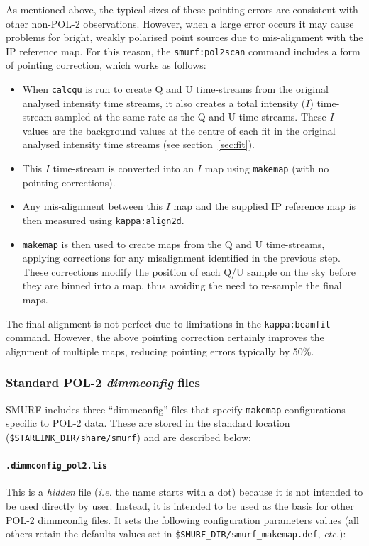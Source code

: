 \documentclass[twoside,11pt]{starlink}
\begin{document}
As mentioned above, the typical sizes of these pointing errors are
consistent with other non-POL-2 observations. However, when a large error
occurs it may cause problems for bright, weakly polarised point sources
due to mis-alignment with the IP reference map. For this reason, the
\texttt{smurf:pol2scan} command includes a form of pointing correction,
which works as follows:

\begin{itemize}
\item When \texttt{calcqu} is run to create Q and U time-streams from the
original analysed intensity time streams, it also creates a total
intensity ($I$) time-stream sampled at the same rate as the Q and U
time-streams. These $I$ values are the background values at the
centre of each fit in the original analysed intensity time streams (see
section~\ref{sec:fit}).
\item This $I$ time-stream is converted into an $I$ map using \texttt{makemap}
(with no pointing corrections).
\item Any mis-alignment between this $I$ map and the supplied IP reference
map is then measured using \texttt{kappa:align2d}.
\item \texttt{makemap} is then used to create maps from the Q and U
time-streams, applying corrections for any misalignment identified in the previous
step. These corrections modify the position of each Q/U sample on the sky
before they are binned into a map, thus avoiding the need to re-sample the
final maps.
\end{itemize}

The final alignment is not perfect due to limitations in the
\texttt{kappa:beamfit} command. However, the above pointing correction
certainly improves the alignment of multiple maps, reducing pointing
errors typically by 50\%.

\subsubsection{Standard POL-2 \emph{dimmconfig} files}
SMURF includes three ``dimmconfig'' files that specify \texttt{makemap}
configurations specific to POL-2 data. These are stored in the standard
location (\texttt{\$STARLINK\_DIR/share/smurf}) and are described below:

\paragraph{\texttt{.dimmconfig\_pol2.lis}}
This is a \emph{hidden} file (\emph{i.e.} the name starts with a dot)
because it is not intended to be used directly by user. Instead, it is
intended to be used as the basis for other POL-2 dimmconfig files. It
sets the following configuration parameters values (all others retain the
defaults values set in \texttt{\$SMURF\_DIR/smurf\_makemap.def},
\emph{etc.}):
\end{document}

